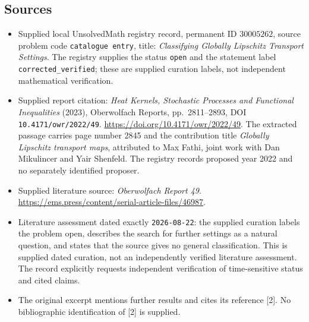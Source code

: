 \documentclass[11pt]{article}
\begin{document}
\subsection{Sources}
\begin{itemize}
\item Supplied local UnsolvedMath registry record, permanent ID \(30005262\), source problem code \texttt{catalogue entry}, title: \emph{Classifying Globally Lipschitz Transport Settings}. The registry supplies the status \texttt{open} and the statement label \texttt{corrected\_verified}; these are supplied curation labels, not independent mathematical verification.
\item Supplied report citation: \emph{Heat Kernels, Stochastic Processes and Functional Inequalities} (2023), Oberwolfach Reports, pp.\ 2811--2893, DOI \texttt{10.4171/owr/2022/49}. \url{https://doi.org/10.4171/owr/2022/49}. The extracted passage carries page number 2845 and the contribution title \emph{Globally Lipschitz transport maps}, attributed to Max Fathi, joint work with Dan Mikulincer and Yair Shenfeld. The registry records proposed year 2022 and no separately identified proposer.
\item Supplied literature source: \emph{Oberwolfach Report 49}. \url{https://ems.press/content/serial-article-files/46987}.
\item Literature assessment dated exactly \texttt{2026-08-22}: the supplied curation labels the problem open, describes the search for further settings as a natural question, and states that the source gives no general classification. This is supplied dated curation, not an independently verified literature assessment. The record explicitly requests independent verification of time-sensitive status and cited claims.
\item The original excerpt mentions further results and cites its reference [2]. No bibliographic identification of [2] is supplied.
\end{itemize}
\end{document}
